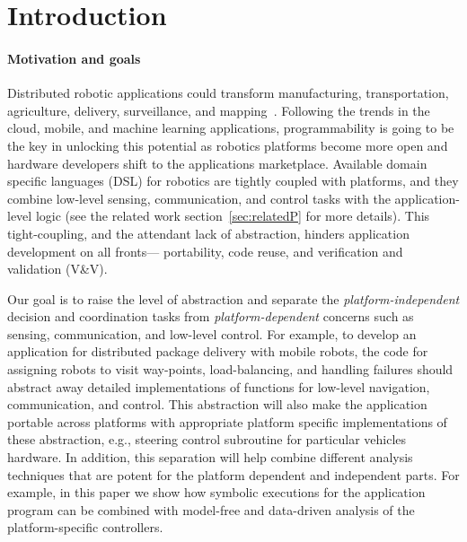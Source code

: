\section{Introduction}
\label{sec:intro}

\paragraph{Motivation and goals}
Distributed robotic applications could transform manufacturing, transportation, agriculture, delivery, surveillance, and mapping~\cite{}. Following the trends in the cloud, mobile, and machine learning applications, programmability is going to be the key in unlocking this potential as robotics platforms become more open and hardware developers shift to the applications marketplace. Available domain specific languages (DSL) for robotics are tightly coupled with platforms, and they combine low-level sensing, communication, and control tasks with the application-level logic (see the related work section~\ref{sec:relatedP} for  more details). This tight-coupling, and the attendant lack of abstraction, hinders  application development on all fronts---  portability, code reuse, and verification and validation (V\&V).


Our goal is to raise the level of abstraction and separate the \emph{platform-independent} decision and coordination tasks from \emph{platform-dependent} concerns such as sensing, communication, and low-level control.	 For example, to develop an application for distributed package delivery with mobile robots, the code for assigning robots to visit way-points, load-balancing, and handling failures should abstract away detailed implementations of functions for low-level navigation, communication, and control. This abstraction will also  make the application  portable across platforms with appropriate platform specific implementations of these abstraction, e.g., steering control subroutine for particular vehicles hardware.
%
In addition, this separation will help combine different analysis techniques that are potent for the platform dependent and independent parts. For example, in this paper we show how symbolic executions for the application program can be combined with  model-free and data-driven analysis of the platform-specific controllers. 


